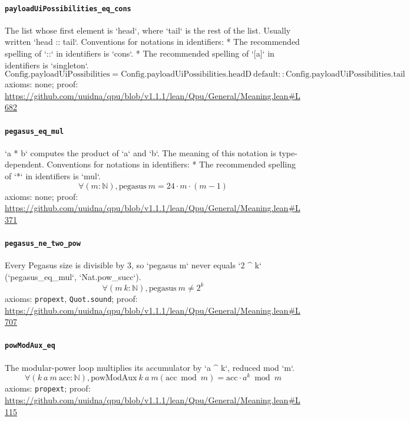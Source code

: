 \documentclass[11pt]{article}
\begin{document}
\paragraph{\texttt{payloadUiPossibilities\_eq\_cons}}
The list whose first element is `head`, where `tail` is the rest of the list. Usually written `head :: tail`.   Conventions for notations in identifiers:   * The recommended spelling of `::` in identifiers is `cons`.   * The recommended spelling of `[a]` in identifiers is `singleton`.
\[ \mathrm{Config.payloadUiPossibilities} = \mathrm{Config.payloadUiPossibilities.headD}\ \mathrm{default} :: \mathrm{Config.payloadUiPossibilities.tail} \]
\noindent axioms: none; proof: \url{https://github.com/uuidna/qpu/blob/v1.1.1/lean/Qpu/General/Meaning.lean\#L682}

\paragraph{\texttt{pegasus\_eq\_mul}}
`a * b` computes the product of `a` and `b`. The meaning of this notation is type-dependent.   Conventions for notations in identifiers:   * The recommended spelling of `*` in identifiers is `mul`.
\[ \forall (m : \mathbb{N}), \mathrm{pegasus}\ m = 24 \cdot m \cdot (m - 1) \]
\noindent axioms: none; proof: \url{https://github.com/uuidna/qpu/blob/v1.1.1/lean/Qpu/General/Meaning.lean\#L371}

\paragraph{\texttt{pegasus\_ne\_two\_pow}}
Every Pegasus size is divisible by 3, so `pegasus m` never equals `2 \^{} k` (`pegasus\_eq\_mul`, `Nat.pow\_succ`).
\[ \forall (m\ k : \mathbb{N}), \mathrm{pegasus}\ m \ne 2 ^{k} \]
\noindent axioms: \texttt{propext}, \texttt{Quot.sound}; proof: \url{https://github.com/uuidna/qpu/blob/v1.1.1/lean/Qpu/General/Meaning.lean\#L707}

\paragraph{\texttt{powModAux\_eq}}
The modular-power loop multiplies its accumulator by `a \^{} k`, reduced mod `m`.
\[ \forall (k\ a\ m\ \mathrm{acc} : \mathbb{N}), \mathrm{powModAux}\ k\ a\ m (\mathrm{acc} \bmod m) = \mathrm{acc} \cdot a ^{k} \bmod m \]
\noindent axioms: \texttt{propext}; proof: \url{https://github.com/uuidna/qpu/blob/v1.1.1/lean/Qpu/General/Meaning.lean\#L115}
\end{document}
